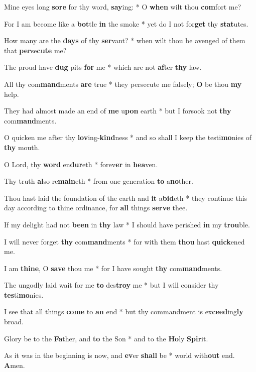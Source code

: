 \begin{multicols}{2}
	Mine eyes long \textbf{sore} for thy word, \textbf{say}ing: * O \textbf{when} wilt thou \textbf{com}fort me?
	
	For I am become like a \textbf{bot}tle \textbf{in} the smoke * yet do I not for\textbf{get} thy \textbf{stat}utes.
	
	How many are the \textbf{days} of thy \textbf{ser}vant? * when wilt thou be avenged of them that \textbf{per}se\textbf{cute} me?
	
	The proud have \textbf{dug} pits \textbf{for} me * which are not \textbf{af}ter \textbf{thy} law.
	
	All thy com\textbf{mand}ments \textbf{are} true * they persecute me falsely; \textbf{O} be thou \textbf{my} help.
	
	They had almost made an end of \textbf{me} u\textbf{pon} earth * but I forsook not \textbf{thy} com\textbf{mand}ments.
	
	O quicken me after thy \textbf{lov}ing-\textbf{kind}ness * and so shall I keep the testi\textbf{mo}nies of \textbf{thy} mouth.
	
	O Lord, thy \textbf{word} en\textbf{dur}eth * forev\textbf{er} in \textbf{hea}ven.
	
	Thy truth \textbf{al}so re\textbf{main}eth * from one generation \textbf{to} a\textbf{no}ther.
	
	Thou hast laid the foundation of the earth and \textbf{it} a\textbf{bid}eth * they continue this day according to thine ordinance, for \textbf{all} things \textbf{serve} thee.
	
	If my delight had not \textbf{been} in \textbf{thy} law * I should have perished \textbf{in} my \textbf{trou}ble.
	
	I will never forget \textbf{thy} com\textbf{mand}ments * for with them \textbf{thou} hast \textbf{quick}ened me.
	
	I am \textbf{thine}, O \textbf{save} thou me * for I have sought \textbf{thy} com\textbf{mand}ments.
	
	The ungodly laid wait for me \textbf{to} des\textbf{troy} me * but I will consider thy \textbf{tes}ti\textbf{mo}nies.
	
	I see that all things \textbf{come} to \textbf{an} end * but thy commandment is ex\textbf{ceed}ing\textbf{ly} broad.
	
	Glory be to the \textbf{Fa}ther, and \textbf{to} the Son * and to the \textbf{Ho}ly \textbf{Spir}it.
	
	As it was in the beginning is now, and \textbf{ev}er \textbf{shall} be * world with\textbf{out} end. \textbf{A}men.
\end{multicols}